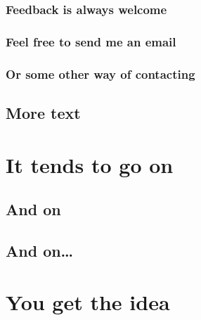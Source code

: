 \documentclass[12pt,a4paper]{csum}
\begin{document}
            \subsubsection{Feedback is always welcome}
            \lipsum[1]
            \subsubsection{Feel free to send me an email}
            \lipsum[1]
            \subsubsection{Or some other way of contacting}
            \lipsum[1]
        \subsection{More text}
        \lipsum[1]
    \section{It tends to go on}
        \lipsum[1]
        \subsection{And on}
        \lipsum[1]
        \subsection{And on\ldots}
        \lipsum[1]
    \section{You get the idea}
    \lipsum[1]
\end{document}
